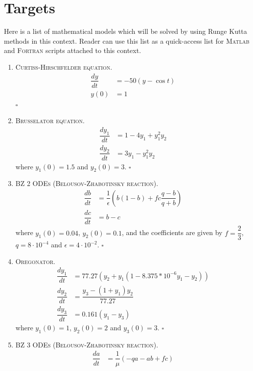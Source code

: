\documentclass[a4paper,oneside]{book}
\numberwithin{equation}{chapter}
\begin{document}
\section{Targets}
Here is a list of mathematical models which will be solved by using Runge Kutta methods in this context. Reader can use this list as a quick-access list for \textsc{Matlab} and \textsc{Fortran} scripts attached to this context.
\begin{enumerate}
\item \textsc{Curtiss-Hirschfelder equation.}
\begin{align}
\dfrac{{dy}}{{dt}}& =  - 50\left( {y - \cos t} \right)\\
y\left( 0 \right) &= 1
\end{align}
\hfill $\square$
\item \textsc{Brusselator equation.} 
\begin{align}
    \dfrac{dy_1}{dt}  &=  1 - 4y_1 + y_1^2 y_2
    \\
    \dfrac{dy_2}{dt}  &=  3y_1 - y_1^2 y_2
\end{align}
where $y_1\left(0\right) = 1.5$ and $y_2\left(0\right) = 3$. \hfill $\square$
\item \textsc{BZ 2 ODEs (Belousov-Zhabotinsky reaction).} 
\begin{align}
    \dfrac{db}{dt}  &=  \dfrac{1}{\epsilon} \left( b\left(1-b\right) + fc\dfrac{q-b}{q+b} \right)
    \\
    \dfrac{dc}{dt}  &=  b-c
\end{align}
where $y_1\left(0\right) = 0.04$, $y_2\left(0\right) = 0.1$, and the coefficients are given by $f = \dfrac{2}{3}$, $q = 8\cdot 10^{-4}$ and $\epsilon = 4\cdot 10^{-2}$. \hfill $\square$
\item \textsc{Oregonator.} 
\begin{align}
    \dfrac{dy_1}{dt}  &=  77.27 \left(y_2  +  y_1 \left(1 - 8.375*10^{-6} y_1 - y_2\right) \right)
    \\
    \dfrac{dy_2}{dt}  &=  \dfrac{y_3 - \left(1+y_1\right)y_2}{77.27}
    \\
    \dfrac{dy_3}{dt}  &=  0.161\left(y_1-y_3\right)
\end{align}
where $y_1\left(0\right) = 1$, $y_2\left(0\right) = 2$ and $y_3\left(0\right) = 3$. \hfill $\square$
\item \textsc{BZ 3 ODEs (Belousov-Zhabotinsky reaction).}
\begin{align}
    \dfrac{da}{dt}  &=  \dfrac{1}{\mu} \left(-qa -ab + fc\right)

\end{align}
\end{enumerate}
\end{document}
